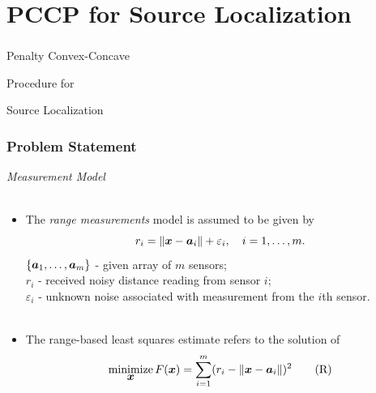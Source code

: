 \documentclass [t] {beamer} %
\begin{document}
\section[Chapter 3]{PCCP for Source Localization}

\begin{frame} [noframenumbering]
\frametitle{  }
\phantom{m} 
\phantom{m}
\phantom{m} 
\phantom{m}
\phantom{m} 
\Huge{\centerline{Penalty Convex-Concave}}

\Huge{\centerline{Procedure for}}

\Huge{\centerline{Source Localization}}

\end{frame}


\begin{frame} %
\frametitle{Problem Statement }
{\large \textit{Measurement Model}} \\~\\
\normalsize
\begin{itemize}
\item
The \textit{range measurements} model is assumed to be given by
\begin{equation} 
\nonumber
r_i = \|{\mbox{\boldmath$x$}} - {\mbox{\boldmath$a$}}_i\| + \varepsilon_i, \quad i = 1, \ldots , m.
\end{equation}  
$\{\mbox{\boldmath$a$}_1,\ldots, \mbox{\boldmath$a$}_m\}$ - given array of $m$ sensors;\\
$r_i$ - received noisy distance reading from sensor $i$; \\
$\varepsilon_i$ - unknown noise associated with measurement from the $i$th sensor. \\ ~\\

\item
The range-based least squares  estimate refers to the solution of%
\begin{equation} \label{R-LS} 
\mathop{\mbox{minimize}}_{\mbox{\boldmath$x$}} F(\mbox{\boldmath$x$})=\sum_{i=1}^{m} (r_i - \|{\mbox{\boldmath$x$}} - {\mbox{\boldmath$a$}}_i\|)^2	\tag{R}
\end{equation}
\end{itemize}
\end{frame}
\end{document}
